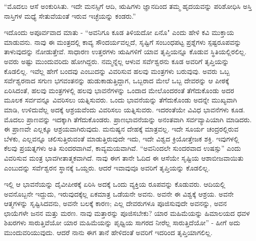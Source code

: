 “ಮೊದಲು ಆಸೆ ಅಂಕುರಿಸಿತು. ಇದೇ ಮನಸ್ಸಿಗೆ ಆದಿ, ಋಷಿಗಳು ಜ್ಞಾನದಿಂದ ತಮ್ಮ ಹೃದಯವನ್ನು ಪರಿಶೋಧಿಸಿ ಅಸ್ತಿ ನಾಸ್ತಿಗಳ ಮಧ್ಯೆ ಸೇತುವೆಯಂತೆ ಇರುವ ಇಚ್ಛೆಯನ್ನು ಕಂಡರು.”

ಇದೊಂದು ಅಪೂರ್ವವಾದ ಮಾತು - “ಅವನಿಗೂ ಕೂಡ ತಿಳಿಯದೋ ಏನೊ" ಎಂದು ಹೇಳಿ ಕವಿ ಮುಕ್ತಾಯ ಮಾಡುವನು. ನಾವು ಈ ಮಂತ್ರದಲ್ಲಿ ಕಾವ್ಯ ಸೌಂದರ್ಯವಲ್ಲದೆ, ಸೃಷ್ಟಿಗೆ ಸಂಬಂಧಪಟ್ಟ ಪ್ರಶ್ನೆಗಳು ಸ್ಪಷ್ಟರೂಪವನ್ನು ತಾಳುವುದನ್ನು ನೋಡುತ್ತೇವೆ. ಸಾಧಾರಣ ಉತ್ತರಗಳು ಋಷಿಗಳಿಗೆ ಯಾವ ತೃಪ್ತಿಯನ್ನೂ ಕೊಡುವ ಸ್ಥಿತಿಯಲ್ಲಿರಲಿಲ್ಲ. ಅವರು ಅಷ್ಟು ಮುಂದುವರಿದು ಹೋಗಿದ್ದರು. ನಮ್ಮನ್ನೆಲ್ಲ ಆಳುವ ಸರ್ವೆಶ್ವರನು ಕೂಡ ಅವರಿಗೆ ತೃಪ್ತಿಯನ್ನು ಕೊಡಲಿಲ್ಲ. ಇವೆಲ್ಲ ಹೇಗೆ ಬಂದವು ಎಂಬುದನ್ನು ವಿವರಿಸುವ ಹಲವು ಮಂತ್ರಗಳು ಬರುವುವು. ಅವರು ಒಬ್ಬ ಸರ್ವೆಶ್ವರನಾದ ಸಗುಣ ಭಗವಂತನನ್ನು ಹುಡುಕಾಡುತ್ತಿದ್ದಾಗ, ಒಬ್ಬರಾದ ಮೇಲೆ ಒಬ್ಬ ದೇವರನ್ನು ಆ ಪೀಠಕ್ಕೆ ಏರಿಸಿದಂತೆ, ಹಲವು ಮಂತ್ರಗಳಲ್ಲಿ ಹಲವು ಭಾವನೆಗಳನ್ನು ಒಂದಾದ ಮೇಲೊಂದರಂತೆ ತೆಗೆದುಕೊಂಡು ಅದರ ಮೂಲಕ ಸರ್ವವನ್ನೂ ವಿವರಿಸಲು ಯತ್ನಿಸುವರು. ಒಂದು ಭಾವನೆಯನ್ನು ತೆಗೆದುಕೊಂಡು ಅದನ್ನೇ ಮುಖ್ಯವಾಗಿ ಮಾಡಿ, ಉಳಿದುವೆಲ್ಲ ಅದಕ್ಕೆ ಆಶ್ರಯವೆಂದು ವಿವರಿಸಲು ಯತ್ನಿಸುವರು. ಇದರಂತೆಯೇ ವಿವಿಧ ಭಾವನೆಗಳು ಕೂಡ. ಮೊದಲು ಪ್ರಾಣವನ್ನು ಇದಕ್ಕಾಗಿ ತೆಗೆದುಕೊಂಡರು. ಪ್ರಾಣಭಾವನೆಯನ್ನು ಅನಂತವಾಗಿ ಸರ್ವವ್ಯಾಪಿಯಾಗಿ ಮಾಡಿದರು. ಈ ಪ್ರಾಣವೇ ಎಲ್ಲಕ್ಕೂ ಆಶ್ರಯವಾಗಿರುವುದು. ಮನುಷ್ಯನ ದೇಹಕ್ಕೆ ಮಾತ್ರವಲ್ಲ. ಇದೇ ಸೂರ್ಯ ಚಂದ್ರರಲ್ಲಿರುವ ಬೆಳಕು, ಎಲ್ಲವನ್ನೂ ಚಲಿಸುತ್ತಿರುವಂತೆ ಮಾಡುತ್ತಿರುವುದೇ ಇದು, ಇದೇ ವಿಶ್ವದ ಕ್ರಿಯೋತ್ತೇಜಕ ಶಕ್ತಿ. ಇವುಗಳಲ್ಲಿ ಕೆಲವು ಪ್ರಯತ್ನಗಳು ಅತಿ ಸುಂದರವಾಗಿವೆ, ಕಾವ್ಯಮಯವಾಗಿವೆ. “ಅವನಿಂದಲೇ ಸುಂದರವಾದ ಉಷಸ್ಸು” ಎಂದು ವಿವರಿಸುವ ಮಂತ್ರ ಭಾವಗೀತಾತ್ಮಕವಾಗಿದೆ. ನಾವು ಈಗ ತಾನೇ ಓದಿದ ಈ ಆಸೆಯೇ ಸೃಷ್ಟಿಯ ಆಶಾಬೀಜವಾಯಿತು ಎಂಬುದನ್ನು ಸರ್ವೆಶ್ವರನ ಸ್ಥಾನಕ್ಕೆ ಒಯ್ದರು. ಆದರೆ ಇವಾವುವೂ ಅವರಿಗೆ ತೃಪ್ತಿಯನ್ನು ಕೊಡಲಿಲ್ಲ.

ಇಲ್ಲಿ ಆ ಭಾವನೆಯನ್ನು ದೈವೀಪೀಠಕ್ಕೆ ಏರಿಸಿ ಅದಕ್ಕೆ ಒಂದು ವ್ಯಕ್ತಿಯ ರೂಪವನ್ನು ಕೊಡುವರು. ಆದಿಯಲ್ಲಿ ಅವನೊಬ್ಬನೇ ಇದ್ದುದು, ಇರುವುದಕ್ಕೆಲ್ಲ ಏಕಮಾತ್ರ ಒಡೆಯನೇ ಅವನು. ಅವನೇ ಈ ವಿಶ್ವಕ್ಕೆ ಆಶ್ರಯ. ಅವನೇ ಆತ್ಮಗಳನ್ನು ಸೃಷ್ಟಿಸಿದವನು, ಅವನೇ ಬಲಕ್ಕೆ ಕಾರಣ; ಎಲ್ಲ ದೇವರುಗಳೂ ಪೂಜಿಸುವುದೇ ಅವನನ್ನು, ಅವನ ಛಾಯೆಗಳೇ ಜನನ ಮತ್ತು ಮರಣ. ನಾವು ಮತ್ತಾರನ್ನು ಪೂಜಿಸಬೇಕು? ಯಾರ ಮಹಿಮೆಯನ್ನು ಹಿಮಾಲಯದ ಧವಳ ಶಿಖರಗಳು ಸಾರುತ್ತಿವೆಯೋ ಯಾರ ಮಹಿಮೆಯನ್ನು ಪೃಥ್ವಿಯ ಸಾಗರದ ನೀರೆಲ್ಲ ಸಾರುತ್ತಿದೆಯೋ'' - ಹೀಗೆ ಅದು ಮುಂದುವರಿಯುವುದು. ಆದರೆ ನಾನು ಈಗ ತಾನೆ ಹೇಳಿದಂತೆ ಅವರಿಗೆ ಇದರಿಂದ ತೃಪ್ತಿಯಾಗಲಿಲ್ಲ.

